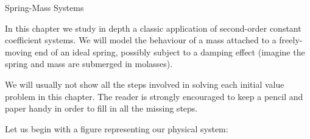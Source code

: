 \documentclass[12pt,letterpaper,twoside]{amsart}
\newcounter{example}
\newcounter{exercise}
\newcounter{problem}
\begin{document}
\sffamily

\begin{center} {\LARGE Spring-Mass Systems} \end{center}

\setcounter{example}{1}
\setcounter{exercise}{1}

In this chapter we study in depth a classic application of second-order constant coefficient systems.  We will model the behaviour of a mass attached to a freely-moving end of an ideal spring, possibly subject to a damping effect (imagine the spring and mass are submerged in molasses).

We will usually not show all the steps involved in solving each initial value problem in this chapter.  The reader is strongly encouraged to keep a pencil and paper handy in order to fill in all the missing steps.

Let us begin with a figure representing our physical system:
\end{document}

